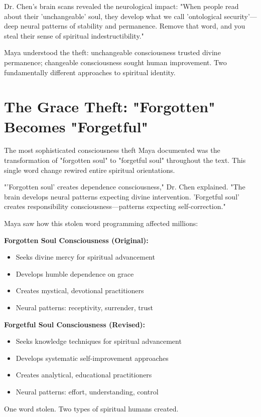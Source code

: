 \documentclass[11pt,twoside]{book}
\begin{document}
Dr. Chen's brain scans revealed the neurological impact: "When people read about their 'unchangeable' soul, they develop what we call 'ontological security'—deep neural patterns of stability and permanence. Remove that word, and you steal their sense of spiritual indestructibility."

Maya understood the theft: unchangeable consciousness trusted divine permanence; changeable consciousness sought human improvement. Two fundamentally different approaches to spiritual identity.
\section*{The Grace Theft: "Forgotten" Becomes "Forgetful"}
\label{sec:org6e217e3}

The most sophisticated consciousness theft Maya documented was the transformation of "forgotten soul" to "forgetful soul" throughout the text. This single word change rewired entire spiritual orientations.

"'Forgotten soul' creates dependence consciousness," Dr. Chen explained. "The brain develops neural patterns expecting divine intervention. 'Forgetful soul' creates responsibility consciousness—patterns expecting self-correction."

Maya saw how this stolen word programming affected millions:

\textbf{\textbf{Forgotten Soul Consciousness (Original):}}
\begin{itemize}
\item Seeks divine mercy for spiritual advancement
\item Develops humble dependence on grace
\item Creates mystical, devotional practitioners
\item Neural patterns: receptivity, surrender, trust
\end{itemize}

\textbf{\textbf{Forgetful Soul Consciousness (Revised):}}
\begin{itemize}
\item Seeks knowledge techniques for spiritual advancement
\item Develops systematic self-improvement approaches
\item Creates analytical, educational practitioners
\item Neural patterns: effort, understanding, control
\end{itemize}

One word stolen. Two types of spiritual humans created.
\end{document}
